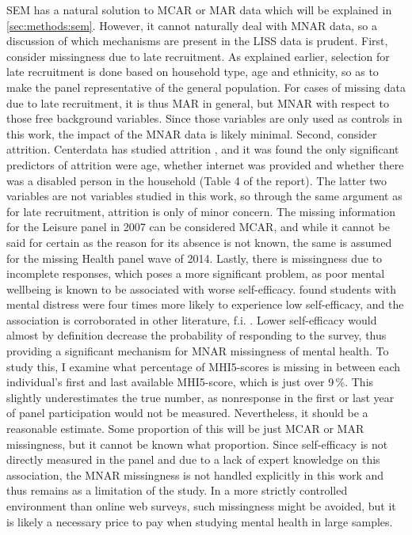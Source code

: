 SEM has a natural solution to MCAR or MAR data which will be explained in \cref{sec:methods:sem}.
However, it cannot naturally deal with MNAR data, so a discussion of which mechanisms are present in the LISS data is prudent.
First, consider missingness due to late recruitment. As explained earlier, selection for late recruitment is done based
on household type, age and ethnicity, so as to make the panel representative of the general population. For cases of missing
data due to late recruitment, it is thus MAR in general, but MNAR with respect to those free background variables.
Since those variables are only used as controls in this work, the impact of the MNAR data is likely minimal.
Second, consider attrition. Centerdata has studied attrition \cite{vos2009attrition}, and it was found the only significant
predictors of attrition were age, whether internet was provided and whether there was a disabled person
in the household (Table 4 of the report). The latter two variables are not variables studied in this work, so through
the same argument as for late recruitment, attrition is only of minor concern.
The missing information for the Leisure panel in 2007 can be considered MCAR, and while it cannot be said for certain as
the reason for its absence is not known, the same is assumed for the missing Health panel wave of 2014.
Lastly, there is missingness due to incomplete responses, which poses a more significant problem, as
poor mental wellbeing is known to be associated with worse self-efficacy.
 found students with mental distress were four times more likely to experience low
self-efficacy, and the association is corroborated in other literature, f.i. .
Lower self-efficacy would almost by definition decrease the probability of responding to the survey, thus providing
a significant mechanism for MNAR missingness of mental health.
To study this, I examine what percentage of MHI5-scores is missing in between each individual's first and last
available MHI5-score, which is just over 9\,\%. This slightly underestimates the true number, as nonresponse
in the first or last year of panel participation would not be measured. Nevertheless, it should be a reasonable
estimate. Some proportion of this will be just MCAR or MAR missingness, but it cannot be known what proportion.
Since self-efficacy is not directly measured in the panel and due to a lack of expert knowledge on this association,
the MNAR missingness is not handled explicitly in this work and thus remains as a limitation of the study.
In a more strictly controlled environment than online web surveys, such missingness might be avoided, but it is likely
a necessary price to pay when studying mental health in large samples.
